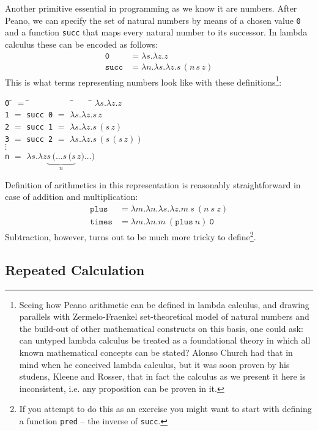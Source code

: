 \documentclass[11pt,twoside,a4paper]{article} %
\newcommand{\sym}[1]{\texttt{#1}}
\newcommand{\msym}[1]{\mathtt{#1}}
\newcommand{\centeredtab}[1]{\begin{center}\parbox{0cm}{\begin{tabbing}#1\end{tabbing}}\end{center}}
\begin{document}
Another primitive essential in programming as we know it are numbers. After
Peano, we can specify the set of natural numbers by means of a chosen value
\sym{0} and a function \sym{succ} that maps every natural number to
its successor. In lambda calculus these can be encoded as follows:
\begin{align*}
\msym{0}    &= \lambda s.\lambda z.z \\
\msym{succ} &= \lambda n.\lambda s.\lambda z.s\,(n\,s\,z)
\end{align*}
This is what terms representing numbers look like with these 
definitions\footnote{Seeing how Peano arithmetic can be defined in lambda calculus,
and drawing parallels with Zermelo-Fraenkel set-theoretical model of
natural numbers and the build-out of other mathematical constructs on this
basis, one could ask: can untyped lambda calculus be treated as a foundational
theory in which all known mathematical concepts can be stated? Alonso Church had 
that in mind when he conceived lambda calculus, but it was soon proven by his 
studens, Kleene and Rosser\cite{wkrp}, that in fact the calculus as we present it here is 
inconsistent, i.e. any proposition can be proven in it.}:
\centeredtab{
\sym{0} \= $=$ \= ~~~~~~~~~    \= ~~~ \= $\lambda s.\lambda z.z$    \\
\sym{1} \> $=$ \> \sym{succ 0} \> $=$ \> $\lambda s.\lambda z.s\,z$ \\
\sym{2} \> $=$ \> \sym{succ 1} \> $=$ \> $\lambda s.\lambda z.s\,(s\,z)$ \\
\sym{3} \> $=$ \> \sym{succ 2} \> $=$ \> $\lambda s.\lambda z.s\,(s\,(s\,z))$ \\
$\vdots$ \\
\sym{n} \> $=$ \> \> \> $\lambda s.\lambda z\underbrace{s\,(\dots s\,(s}_n\,z)\dots)$
}
Definition of arithmetics in this representation is reasonably straightforward
in case of addition and multiplication:
\begin{align*}
\msym{plus}  &= \lambda m.\lambda n.\lambda s. \lambda z.m\ s\ (n\ s\ z) \\
\msym{times} &= \lambda m.\lambda n.m\ (\msym{plus}\ n)\ \msym{0}
\end{align*}
Subtraction, however, turns out to be much more tricky to define\footnote{If
you attempt to do this as an exercise you might want to start with defining a
function \sym{pred} -- the inverse of \sym{succ}.}.

\subsection{Repeated Calculation}
\end{document}
